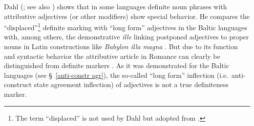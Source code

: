 {Dahl (\citeyear[149–152]{dahl2003}; see also \citealt[115]{dahl2007}) shows that in some languages definite noun phrases with attributive adjectives (or other modifiers) show special behavior. He compares the “displaced”\footnote{The term “displaced” is not used by Dahl but adopted from \citet[114–116]{melcuk2006}.} definite marking with “long form” adjectives in the Baltic languages with, among others, the demonstrative \textit{ille} linking postponed adjectives to proper nouns in Latin constructions like \textit{Babylon illa magna} \cite[150]{dahl2003}. But due to its function and syntactic behavior the attributive article in Romance can clearly be distinguished from definite markers \citep[329]{gamillscheg1937}. As it was demonstrated for the Baltic languages (see \S~\ref{anti-constr agr}), the so-called “long form” inflection (i.e.~anti-construct state agreement inflection) of adjectives is not a true definiteness marker.

}
